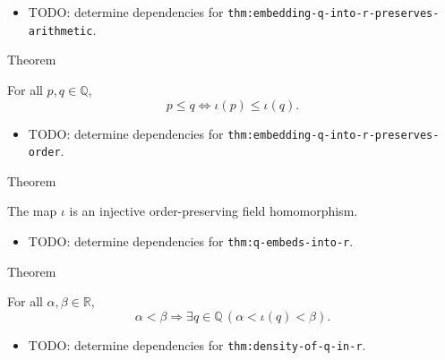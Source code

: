 \begin{dependencies}
\begin{itemize}
  \item TODO: determine dependencies for \texttt{thm:embedding-q-into-r-preserves-arithmetic}.
\end{itemize}
\end{dependencies}

\begin{theorembox}{Theorem}
\begin{theorem}
\label{thm:embedding-q-into-r-preserves-order}
For all $p,q\in\mathbb{Q}$,
\[
p\le q \Longleftrightarrow \iota(p)\le\iota(q).
\]
\end{theorem}
\end{theorembox}

\begin{dependencies}
\begin{itemize}
  \item TODO: determine dependencies for \texttt{thm:embedding-q-into-r-preserves-order}.
\end{itemize}
\end{dependencies}

\begin{theorembox}{Theorem}
\begin{theorem}
\label{thm:q-embeds-into-r}
The map $\iota$ is an injective order-preserving field homomorphism.
\end{theorem}
\end{theorembox}

\begin{dependencies}
\begin{itemize}
  \item TODO: determine dependencies for \texttt{thm:q-embeds-into-r}.
\end{itemize}
\end{dependencies}

\begin{theorembox}{Theorem}
\begin{theorem}
\label{thm:density-of-q-in-r}
For all $\alpha,\beta\in\mathbb{R}$,
\[
\alpha<\beta \Longrightarrow \exists q\in\mathbb{Q}\,(\alpha<\iota(q)<\beta).
\]
\end{theorem}
\end{theorembox}

\begin{dependencies}
\begin{itemize}
  \item TODO: determine dependencies for \texttt{thm:density-of-q-in-r}.
\end{itemize}
\end{dependencies}

